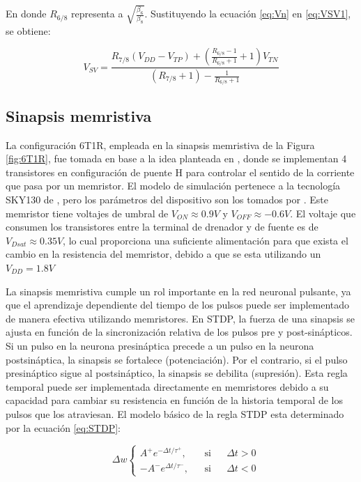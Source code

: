 \documentclass[conference]{IEEEtran}
\begin{document}
En donde $R_{6/8}$ representa a $\sqrt{\frac{\beta_{6}}{\beta_{8}}}$. Sustituyendo la ecuación \ref{eq:Vn} en \ref{eq:VSV1}, se obtiene:

\begin{equation}
	V_{SV} = \frac{R_{7/8}(V_{DD}-V_{TP})+\left(\frac{R_{6/8}-1}{R_{6/8}+1}+1\right)V_{TN}}{\left(R_{7/8}+1\right)-\frac{1}{R_{6/8}+1}}
	\label{eq:VSV2}
\end{equation}

\subsection{Sinapsis memristiva}
La configuración 6T1R, empleada en la sinapsis memristiva de la Figura \ref{fig:6T1R}, fue tomada en base a la idea planteada en \cite{Tian_2022}, donde se implementan 4 transistores en configuración de puente H para controlar el sentido de la corriente que pasa por un memristor. El modelo de simulación pertenece a la tecnología SKY130 de \cite{SKY130reram}\cite{SKY130reramGitHub}, pero los parámetros del dispositivo son los tomados por \cite{Wang_2016}\cite{Alshaya_2022}. Este memristor tiene voltajes de umbral de $V_{ON}\approx 0.9V$ y $V_{OFF}\approx -0.6V$. El voltaje que consumen los transistores entre la terminal de drenador y de fuente es de $V_{Dsat}\approx 0.35V$, lo cual proporciona una suficiente alimentación para que exista el cambio en la resistencia del memristor, debido a que se esta utilizando un $V_{DD}=1.8V$

La sinapsis memristiva cumple un rol importante en la red neuronal pulsante, ya que el aprendizaje dependiente del tiempo de los pulsos puede ser implementado de manera efectiva utilizando memristores. En STDP, la fuerza de una sinapsis se ajusta en función de la sincronización relativa de los pulsos pre y post-sinápticos. Si un pulso en la neurona presináptica precede a un pulso en la neurona postsináptica, la sinapsis se fortalece (potenciación). Por el contrario, si el pulso presináptico sigue al postsináptico, la sinapsis se debilita (supresión). Esta regla temporal puede ser implementada directamente en memristores debido a su capacidad para cambiar su resistencia en función de la historia temporal de los pulsos que los atraviesan. El modelo básico de la regla STDP esta determinado por la ecuación \ref{eq:STDP}:

\begin{equation}
    \quad \Delta w
        \left \{
            \begin{aligned}
                A^{+}e^{-\Delta t/\tau^{+}}, & & \text{si} & & \Delta t > 0 \\
                -A^{-}e^{\Delta t/\tau^{-}}, & & \text{si} & & \Delta t < 0
            \end{aligned}
        \right.
    \label{eq:STDP}
\end{equation}
\end{document}
